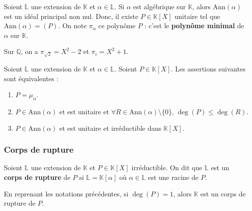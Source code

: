 	\begin{definition}
		Soient $\mathbb{L}$ une extension de $\mathbb{K}$ et $\alpha \in \mathbb{L}$. Si $\alpha$ est algébrique sur $\mathbb{K}$, alors $\mathrm{Ann}(\alpha)$ est un idéal principal non nul. Donc, il existe $P \in \mathbb{K}[X]$ unitaire tel que $\mathrm{Ann}(\alpha) = (P)$. On note $\pi_\alpha$ ce polynôme $P$ : c'est le \textbf{polynôme minimal} de $\alpha$ sur $\mathbb{K}$.
	\end{definition}

	\begin{example}
		Sur $\mathbb{Q}$, on a $\pi_{\sqrt{2}} = X^2 - 2$ et $\pi_i = X^2 + 1$.
	\end{example}


	\begin{proposition}
		Soient $\mathbb{L}$ une extension de $\mathbb{K}$ et $\alpha \in \mathbb{L}$. Soient $P \in \mathbb{K}[X]$. Les assertions suivantes sont équivalentes :
		\begin{enumerate}[label=(\roman*)]
			\item $P = \mu_\alpha$.
			\item $P \in \mathrm{Ann}(\alpha)$ et est unitaire et $\forall R \in \mathrm{Ann}(\alpha) \setminus \{ 0 \}, \, \deg(P) \leq \deg(R)$.
			\item $P \in \mathrm{Ann}(\alpha)$ et est unitaire et irréductible dans $\mathbb{K}[X]$.
		\end{enumerate}
	\end{proposition}

	\subsubsection{Corps de rupture}


	\begin{definition}
		Soient $\mathbb{L}$ une extension de $\mathbb{K}$ et $P \in \mathbb{K}[X]$ irréductible. On dit que $\mathbb{L}$ est un \textbf{corps de rupture} de $P$ si $\mathbb{L} = \mathbb{K}[\alpha]$ où $\alpha \in \mathbb{L}$ est une racine de $P$.
	\end{definition}

	\begin{example}
		En reprenant les notations précédentes, si $\deg(P) = 1$, alors $\mathbb{K}$ est un corps de rupture de $P$.
	\end{example}

